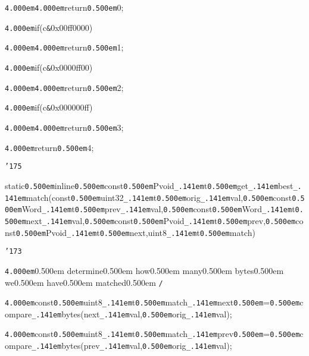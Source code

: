 \noindent
{}{\tt\mc \kern4.000em}{\tt\mc \kern4.000em}return{\tt\mc \kern0.500em}0;

\noindent
{}{\tt\mc \kern4.000em}if(c{\tt\&}0x00ff0000)

\noindent
{}{\tt\mc \kern4.000em}{\tt\mc \kern4.000em}return{\tt\mc \kern0.500em}1;

\noindent
{}{\tt\mc \kern4.000em}if(c{\tt\&}0x0000ff00)

\noindent
{}{\tt\mc \kern4.000em}{\tt\mc \kern4.000em}return{\tt\mc \kern0.500em}2;

\noindent
{}{\tt\mc \kern4.000em}if(c{\tt\&}0x000000ff)

\noindent
{}{\tt\mc \kern4.000em}{\tt\mc \kern4.000em}return{\tt\mc \kern0.500em}3;

\noindent
{}{\tt\mc \kern4.000em}return{\tt\mc \kern0.500em}4;

\noindent
{}{\tt\char'175}

\noindent
{}\hfill

\noindent
{}\hfill

\noindent
{}static{\tt\mc \kern0.500em}inline{\tt\mc \kern0.500em}const{\tt\mc \kern0.500em}Pvoid{\tt\_\kern.141em}t{\tt *}{\tt\mc \kern0.500em}get{\tt\_\kern.141em}best{\tt\_\kern.141em}match(const{\tt\mc \kern0.500em}uint32{\tt\_\kern.141em}t{\tt\mc \kern0.500em}orig{\tt\_\kern.141em}val,{\tt\mc \kern0.500em}const{\tt\mc \kern0.500em}Word{\tt\_\kern.141em}t{\tt\mc \kern0.500em}prev{\tt\_\kern.141em}val,{\tt\mc \kern0.500em}const{\tt\mc \kern0.500em}Word{\tt\_\kern.141em}t{\tt\mc \kern0.500em}next{\tt\_\kern.141em}val,{\tt\mc \kern0.500em}const{\tt\mc \kern0.500em}Pvoid{\tt\_\kern.141em}t{\tt *}{\tt\mc \kern0.500em}prev,{\tt\mc \kern0.500em}const{\tt\mc \kern0.500em}Pvoid{\tt\_\kern.141em}t{\tt *}{\tt\mc \kern0.500em}next,uint8{\tt\_\kern.141em}t{\tt *}{\tt\mc \kern0.500em}match)

\noindent
{}{\tt\char'173}

\noindent
{}{\tt\mc \kern4.000em}\rm\mc {\tt /}{\tt *}\kern0.500em determine\kern0.500em how\kern0.500em many\kern0.500em bytes\kern0.500em we\kern0.500em have\kern0.500em matched\kern0.500em {\tt *}{\tt /}
\tt\mc 

\noindent
{}{\tt\mc \kern4.000em}const{\tt\mc \kern0.500em}uint8{\tt\_\kern.141em}t{\tt\mc \kern0.500em}match{\tt\_\kern.141em}next{\tt\mc \kern0.500em}={\tt\mc \kern0.500em}compare{\tt\_\kern.141em}bytes(next{\tt\_\kern.141em}val,{\tt\mc \kern0.500em}orig{\tt\_\kern.141em}val);

\noindent
{}{\tt\mc \kern4.000em}const{\tt\mc \kern0.500em}uint8{\tt\_\kern.141em}t{\tt\mc \kern0.500em}match{\tt\_\kern.141em}prev{\tt\mc \kern0.500em}={\tt\mc \kern0.500em}compare{\tt\_\kern.141em}bytes(prev{\tt\_\kern.141em}val,{\tt\mc \kern0.500em}orig{\tt\_\kern.141em}val);

